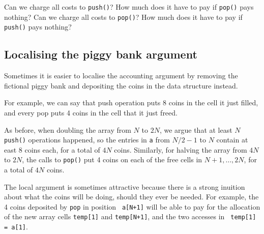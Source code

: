 \documentclass{tufte-handout}
\begin{document}
\begin{ExerciseList}\small
  \Exercise \label{ex: only push}Can we charge all costs to
  \texttt{push()}? How much does it have to pay if \texttt{pop()} pays nothing?
  \Exercise Can we charge all costs to
  \texttt{pop()}? How much does it have to pay if \texttt{push()} pays nothing?
\end{ExerciseList}

\subsection{Localising the piggy bank argument}

Sometimes it is easier to localise the accounting argument by removing
the fictional piggy bank and depositing the coins in the data
structure instead.

For example, we can say that push operation puts 8 coins in the cell
it just filled, and every pop puts 4 coins in the cell that it just
freed. 

As before, when doubling the array from $N$ to $2N$, we argue that at
least $N$ {\tt push()} operations happened, so the entries in {\tt a}
from $N/2-1$ to $N$ contain at east 8 coins each, for a total of $4N$
coins. Similarly, for halving the array from $4N$ to $2N$, the calls
to {\tt pop()} put 4 coins on each of the free cells in $N+1,\ldots,
2N$, for a total of $4N$ coins. 

The local argument is sometimes attractive because there is a strong
inuition about what the coins will be doing, should they ever be
needed.  
For example, the 4 coins deposited by {\tt pop} in position {\tt
  a[N+1]} will be able to pay for the allocation of the new array
cells {\tt temp[1]} and {\tt temp[N+1]}, and the two accesses in {\tt
  temp[1] = a[1]}.
\end{document}
